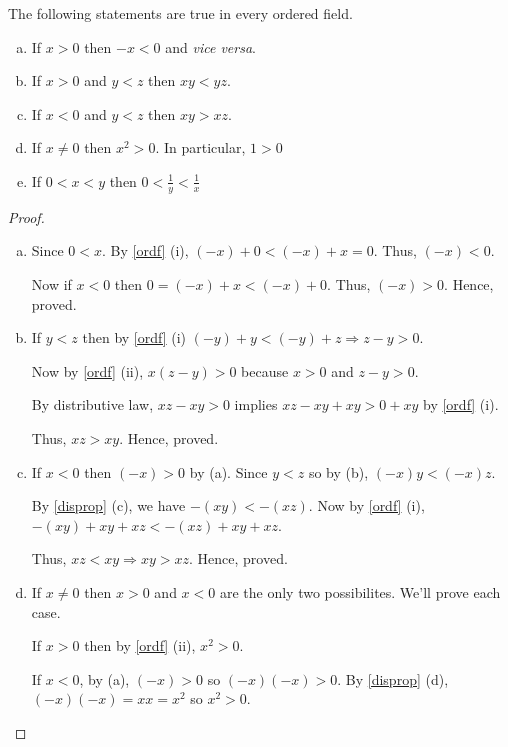 \begin{prop}
    The following statements are true in every ordered field.
    \begin{enumerate}[a)]
        \item If $x > 0$ then $ -x < 0$ and {\it vice versa}.
        \item If $x > 0$ and $y < z$ then $xy < yz$.
        \item If $x < 0$ and $y < z$ then $xy > xz$.
        \item If $x \neq 0$ then $x^2 > 0$. In particular, $1 > 0$
        \item If $0 < x < y$ then $0 < \frac{1}{y} < \frac{1}{x} $
    \end{enumerate}
\end{prop}

\begin{proof}
    \begin{enumerate}[a)]
        \item Since $0 < x$. By \ref{ordf} (i), $(-x) + 0 < (-x) + x = 0$. Thus, $(-x) < 0$.

        Now if $x < 0$ then $0 = (-x) + x < (-x) + 0$. Thus, $(-x) > 0$.
        Hence, proved.

        \item If $y < z$ then by \ref{ordf} (i) $(-y) + y < (-y) + z \Rightarrow z - y > 0$.
        
        Now by \ref{ordf} (ii), $x(z - y) > 0$ because $x > 0$ and $z - y > 0$.
        
        By distributive law, $xz - xy > 0$ implies $xz - xy + xy > 0 + xy$ by \ref{ordf} (i).
        
        Thus, $xz  > xy$. Hence, proved.

        \item If $x < 0$ then $(-x) > 0$ by (a). 
        Since $y < z$ so by (b), $(-x)y < (-x)z$. 

        By \ref{disprop} (c), we have $-(xy) < -(xz)$.
        Now by \ref{ordf} (i), $-(xy) + xy + xz < -(xz) + xy + xz$.
        
        Thus, $xz < xy \Rightarrow xy > xz$. Hence, proved.

        \item If $x \neq 0$ then $x > 0$ and $x < 0$ are the only two possibilites.
        We'll prove each case.
        
        If $x > 0$ then by \ref{ordf} (ii), $x^2 > 0$.

        If $x < 0$, by (a), $(-x) > 0$ so $(-x)(-x) > 0$. 
        By \ref{disprop} (d), $(-x)(-x) = xx = x^2$ so $x^2 > 0$.
        

\end{enumerate}
\end{proof}
